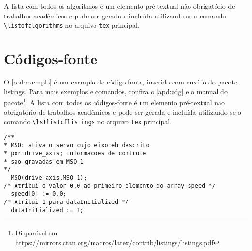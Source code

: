 A lista com todos os algoritmos é um elemento pré-textual não obrigatório de trabalhos acadêmicos e pode ser gerada e incluída utilizando-se o comando \verb|\listofalgorithms| no arquivo \texttt{tex} principal.

\section{Códigos-fonte}

O \cref{cod:exemplo} é um exemplo de código-fonte, inserido com auxílio do pacote \textsf{listings}. Para mais exemplos e comandos, confira o \cref{apd:cdg} e o manual do pacote\footnote{Disponível em \url{https://mirrors.ctan.org/macros/latex/contrib/listings/listings.pdf}}. A lista com todos os códigos-fonte é um elemento pré-textual não obrigatório de trabalhos acadêmicos e pode ser gerada e incluída utilizando-se o comando \verb|\lstlistoflistings| no arquivo \texttt{tex} principal.

\begin{lstlisting}[float=htb,caption={Exemplo de código-fonte},label={cod:exemplo}]
/**
* MSO: ativa o servo cujo eixo eh descrito
* por drive_axis; informacoes de controle
* sao gravadas em MSO_1
*/
  MSO(drive_axis,MSO_1);
/* Atribui o valor 0.0 ao primeiro elemento do array speed */
  speed[0] := 0.0; 
/* Atribui 1 para dataInitialized */
  dataInitialized := 1;
\end{lstlisting}